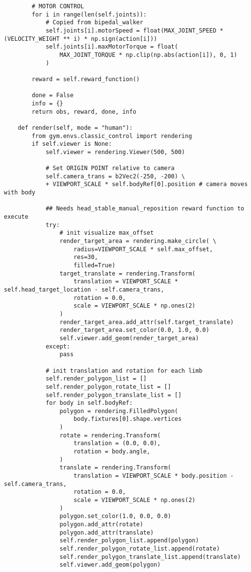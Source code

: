 \begin{lstlisting}
        # MOTOR CONTROL
        for i in range(len(self.joints)):
            # Copied from bipedal_walker
            self.joints[i].motorSpeed = float(MAX_JOINT_SPEED * (VELOCITY_WEIGHT ** i) * np.sign(action[i]))
            self.joints[i].maxMotorTorque = float(
                MAX_JOINT_TORQUE * np.clip(np.abs(action[i]), 0, 1)
            )

        reward = self.reward_function()

        done = False
        info = {}
        return obs, reward, done, info

    def render(self, mode = "human"):
        from gym.envs.classic_control import rendering
        if self.viewer is None:
            self.viewer = rendering.Viewer(500, 500)

            # Set ORIGIN POINT relative to camera
            self.camera_trans = b2Vec2(-250, -200) \
            + VIEWPORT_SCALE * self.bodyRef[0].position # camera moves with body

            ## Needs head_stable_manual_reposition reward function to execute
            try:
                # init visualize max_offset
                render_target_area = rendering.make_circle( \
                    radius=VIEWPORT_SCALE * self.max_offset,
                    res=30,
                    filled=True)
                target_translate = rendering.Transform(
                    translation = VIEWPORT_SCALE * self.head_target_location - self.camera_trans,
                    rotation = 0.0,
                    scale = VIEWPORT_SCALE * np.ones(2)
                )
                render_target_area.add_attr(self.target_translate)
                render_target_area.set_color(0.0, 1.0, 0.0)
                self.viewer.add_geom(render_target_area)
            except:
                pass

            # init translation and rotation for each limb
            self.render_polygon_list = []
            self.render_polygon_rotate_list = []
            self.render_polygon_translate_list = []
            for body in self.bodyRef:
                polygon = rendering.FilledPolygon(
                    body.fixtures[0].shape.vertices
                )
                rotate = rendering.Transform(
                    translation = (0.0, 0.0),
                    rotation = body.angle,
                )
                translate = rendering.Transform(
                    translation = VIEWPORT_SCALE * body.position - self.camera_trans,
                    rotation = 0.0,
                    scale = VIEWPORT_SCALE * np.ones(2)
                )
                polygon.set_color(1.0, 0.0, 0.0)
                polygon.add_attr(rotate)
                polygon.add_attr(translate)
                self.render_polygon_list.append(polygon)
                self.render_polygon_rotate_list.append(rotate)
                self.render_polygon_translate_list.append(translate)
                self.viewer.add_geom(polygon)


\end{lstlisting}
